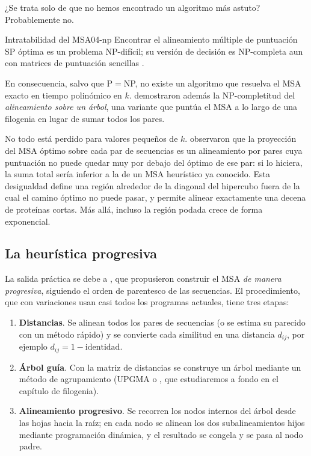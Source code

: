 ¿Se trata solo de que no hemos encontrado un algoritmo más astuto? Probablemente no.

\begin{teorema}{Intratabilidad del MSA}{04-np}
Encontrar el alineamiento múltiple de puntuación SP óptima es un problema NP-difícil; su versión de decisión es NP-completa aun con matrices de puntuación sencillas \parencite{c04-wang1994}.
\end{teorema}

En consecuencia, salvo que P${}={}$NP, no existe un algoritmo que resuelva el MSA exacto en tiempo polinómico en $k$. \textcite{c04-wang1994} demostraron además la NP-completitud del \emph{alineamiento sobre un árbol}, una variante que puntúa el MSA a lo largo de una filogenia en lugar de sumar todos los pares.

\begin{profundizacion}
No todo está perdido para valores pequeños de $k$. \textcite{c04-carrillo1988} observaron que la proyección del MSA óptimo sobre cada par de secuencias es un alineamiento por pares cuya puntuación no puede quedar muy por debajo del óptimo de ese par: si lo hiciera, la suma total sería inferior a la de un MSA heurístico ya conocido. Esta desigualdad define una región alrededor de la diagonal del hipercubo fuera de la cual el camino óptimo no puede pasar, y permite alinear exactamente una decena de proteínas cortas. Más allá, incluso la región podada crece de forma exponencial.
\end{profundizacion}

\subsection{La heurística progresiva}

La salida práctica se debe a \textcite{c04-feng1987}, que propusieron construir el MSA \emph{de manera progresiva}, siguiendo el orden de parentesco de las secuencias. El procedimiento, que con variaciones usan casi todos los programas actuales, tiene tres etapas:

\begin{enumerate}
  \item \textbf{Distancias}. Se alinean todos los pares de secuencias (o se estima su parecido con un método rápido) y se convierte cada similitud en una distancia $d_{ij}$, por ejemplo $d_{ij}=1-\text{identidad}$.
  \item \textbf{Árbol guía}. Con la matriz de distancias se construye un árbol mediante un método de agrupamiento (UPGMA o , que estudiaremos a fondo en el capítulo de filogenia).
  \item \textbf{Alineamiento progresivo}. Se recorren los nodos internos del árbol desde las hojas hacia la raíz; en cada nodo se alinean los dos subalineamientos hijos mediante programación dinámica, y el resultado se congela y se pasa al nodo padre.
\end{enumerate}

